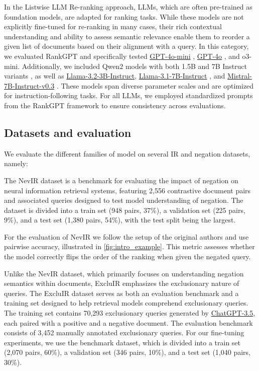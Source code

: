In the Listwise LLM Re-ranking approach, LLMs, which are often pre-trained as foundation models, are adapted for ranking tasks. While these models are not explicitly fine-tuned for re-ranking in many cases, their rich contextual understanding and ability to assess semantic relevance enable them to reorder a given list of documents based on their alignment with a query. 
In this category, we evaluated RankGPT \cite{rankGPT} and specifically tested \url{GPT-4o-mini} \cite{openai2024gpt4technicalreport}, \url{GPT-4o} \cite{openai2024gpt4technicalreport}, and o3-mini. Additionally, we included Qwen2 models with both 1.5B and 7B Instruct variants \cite{qwen_gte}, as well as \url{Llama-3.2-3B-Instruct}, \url{Llama-3.1-7B-Instruct} \cite{llama3}, and \url{Mistral-7B-Instruct-v0.3} \cite{mistral7b}. These models span diverse parameter scales and are optimized for instruction-following tasks. 
For all LLMs, we employed standardized prompts from the RankGPT framework to ensure consistency across evaluations.






\subsection{Datasets and evaluation} \label{dataset_description} 
We evaluate the different families of model on several IR and negation datasets, namely:

The NevIR \cite{weller2024nevirnegationneuralinformation} dataset is a benchmark for evaluating the impact of negation on neural information retrieval systems, featuring 2,556 contrastive document pairs and associated queries designed to test model understanding of negation. The dataset is divided into a train set (948 pairs, 37\%), a validation set (225 pairs, 9\%), and a test set (1,380 pairs, 54\%), with the test split being the largest. 

For the evaluation of NevIR we follow the setup of the original authors and use pairwise accuracy, illustrated in \autoref{fig:intro_example}. This metric assesses whether the model correctly flips the order of the ranking when given the negated query. 



Unlike the NevIR dataset, which primarily focuses on understanding negation semantics within documents, ExcluIR emphasizes the exclusionary nature of queries. The ExcluIR dataset \cite{zhang2024excluir} serves as both an evaluation benchmark and a training set designed to help retrieval models comprehend exclusionary queries. The training set contains 70,293 exclusionary queries generated by \url{ChatGPT-3.5}, each paired with a positive and a negative document. The evaluation benchmark consists of 3,452 manually annotated exclusionary queries. For our fine-tuning experiments, we use the benchmark dataset, which is divided into a train set (2,070 pairs, 60\%), a validation set (346 pairs, 10\%), and a test set (1,040 pairs, 30\%). 

